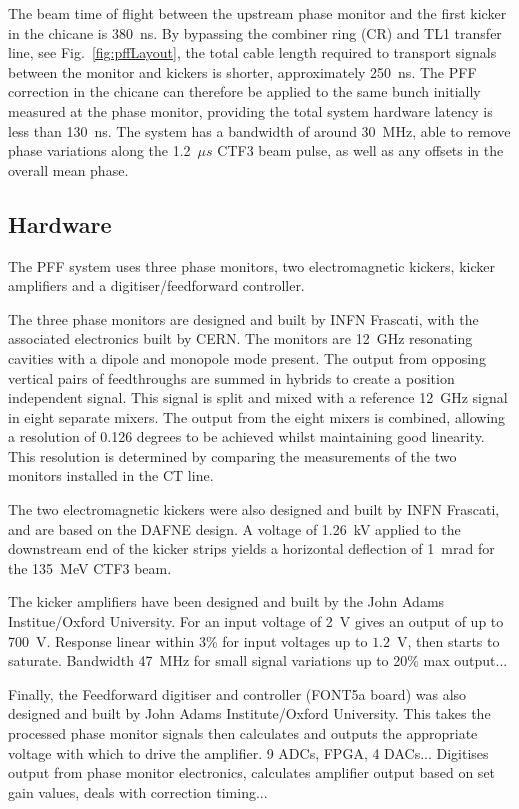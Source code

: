 \documentclass[%
 reprint,
 amsmath,amssymb,
 aps,
]{revtex4-1}
\begin{document}
The beam time of flight between the upstream phase monitor and the first kicker 
in the chicane is 380~ns. By bypassing the combiner ring (CR) and TL1 transfer 
line, see Fig.~\ref{fig:pffLayout}, the total cable length required to 
transport signals between the monitor and kickers is shorter, approximately 
250~ns. The PFF correction in the chicane can therefore be applied to the same 
bunch initially measured at the phase monitor, providing the total system 
hardware latency is less than 130~ns. The system has a bandwidth of around 
30~MHz, able to remove phase variations along the 1.2~\(\mu s\) CTF3 beam 
pulse, as well as any offsets in the overall mean phase.


\subsection{\label{ss:hardware}Hardware}

The PFF system uses three phase monitors, two electromagnetic kickers, kicker 
amplifiers and a digitiser/feedforward controller.

The three phase monitors are designed and built by INFN Frascati, with the 
associated electronics built by CERN. The monitors are 12~GHz resonating 
cavities with a dipole and monopole mode present. The output from opposing 
vertical pairs of feedthroughs are summed in hybrids to create a position 
independent signal. This signal is split and mixed with a reference 12~GHz 
signal in eight separate mixers. The output from the eight mixers is combined, 
allowing a resolution of 0.126 degrees to be 
achieved whilst maintaining good linearity. This resolution is determined by 
comparing the measurements of the two monitors installed in the CT line.

The two electromagnetic kickers were also designed and built by INFN Frascati,  
and are based on the DAFNE design. A voltage of 1.26~kV applied to the 
downstream end of the kicker strips yields a horizontal deflection of 1~mrad 
for the 135~MeV CTF3 beam.

The kicker amplifiers have been designed and built by the John Adams 
Institue/Oxford University. For 
an input voltage of 2~V gives an output of up to 700~V. Response linear within 
3\% for input voltages up to \(1.2\)~V, then starts to saturate. Bandwidth 
47~MHz for small signal variations up to 20\% max output...

Finally, the Feedforward digitiser and controller (FONT5a board) was also 
designed and built by John Adams Institute/Oxford University. This takes the 
processed phase monitor signals then calculates and outputs the appropriate 
voltage with which to drive the amplifier. 9 ADCs, FPGA, 4 DACs... Digitises 
output from phase monitor electronics, calculates amplifier output based on set 
gain values, deals with correction timing...
\end{document}
